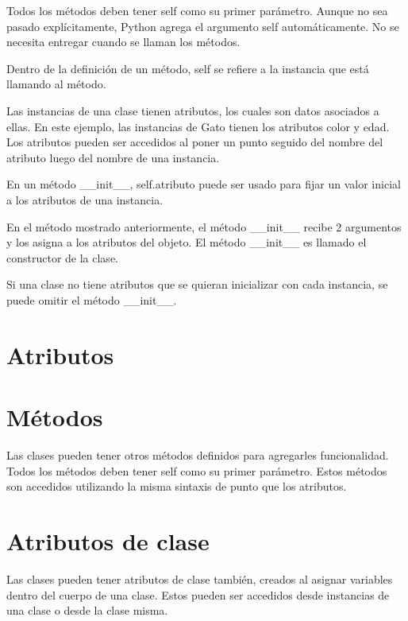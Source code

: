 \documentclass{report}
\begin{document}
Todos los métodos deben tener self como su primer parámetro. Aunque no sea pasado explícitamente, Python agrega el argumento self automáticamente. No se necesita entregar cuando se llaman los métodos.

Dentro de la definición de un método, self se refiere a la instancia que está llamando al método.

Las instancias de una clase tienen atributos, los cuales son datos asociados a ellas. En este ejemplo, las instancias de Gato tienen los atributos color y edad. Los atributos pueden ser accedidos al poner un punto seguido del nombre del atributo luego del nombre de una instancia.


En un método \_\_init\_\_, self.atributo puede ser usado para fijar un valor inicial a los atributos de una instancia.

En el método mostrado anteriormente, el método \_\_init\_\_ recibe 2 argumentos y los asigna a los atributos del objeto. El método \_\_init\_\_ es llamado el constructor de la clase.

Si una clase no tiene atributos que se quieran inicializar con cada instancia, se puede omitir el método \_\_init\_\_.



\section{Atributos}

\section{Métodos}

Las clases pueden tener otros métodos definidos para agregarles funcionalidad. Todos los métodos deben tener self como su primer parámetro.
Estos métodos son accedidos utilizando la misma sintaxis de punto que los atributos.


\section{Atributos de clase}

Las clases pueden tener atributos de clase también, creados al asignar variables dentro del cuerpo de una clase. Estos pueden ser accedidos desde instancias de una clase o desde la clase misma.
\end{document}
